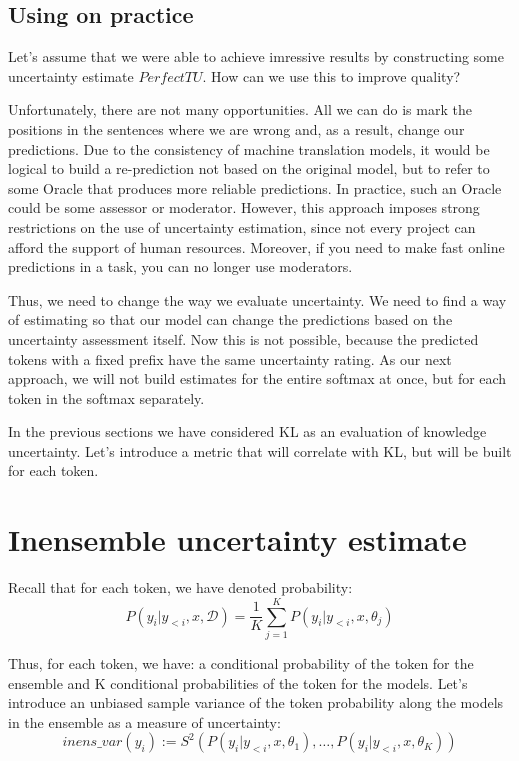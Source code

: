 \documentclass[a4paper,14pt]{extarticle}
\begin{document}
\subsection{Using on practice}
	Let's assume that we were able to achieve imressive results by constructing some uncertainty estimate $PerfectTU$. How can we use this to improve quality?

	Unfortunately, there are not many opportunities. All we can do is mark the positions in the sentences where we are wrong and, as a result, change our predictions. Due to the consistency of machine translation models, it would be logical to build a re-prediction not based on the original model, but to refer to some Oracle that produces more reliable predictions. In practice, such an Oracle could be some assessor or moderator. However, this approach imposes strong restrictions on the use of uncertainty estimation, since not every project can afford the support of human resources. Moreover, if you need to make fast online predictions in a task, you can no longer use moderators.

	Thus, we need to change the way we evaluate uncertainty. We need to find a way of estimating so that our model can change the predictions based on the uncertainty assessment itself. Now this is not possible, because the predicted tokens with a fixed prefix have the same uncertainty rating. As our next approach, we will not build estimates for the entire softmax at once, but for each token in the softmax separately.

	In the previous sections we have considered KL as an evaluation of knowledge uncertainty. Let's introduce a metric that will correlate with KL, but will be built for each token.

\section{Inensemble uncertainty estimate}
	Recall that for each token, we have denoted probability:
	\begin{equation*}
		P(y_i | y_{<i}, x, \mathcal{D}) = \frac1{K} \sum_{j=1}^{K}P(y_i | y_{<i}, x, \theta_j)
	\end{equation*}
	
	Thus, for each token, we have: a conditional probability of the token for the ensemble and K conditional probabilities of the token for the models. Let's introduce an unbiased sample variance of the token probability along the models in the ensemble as a measure of uncertainty:
	\begin{equation}
		inens\_var(y_i) := S^2(P(y_i | y_{<i}, x, \theta_1), \dots, P(y_i | y_{<i}, x, \theta_K))
	\end{equation}
	
\end{document}
